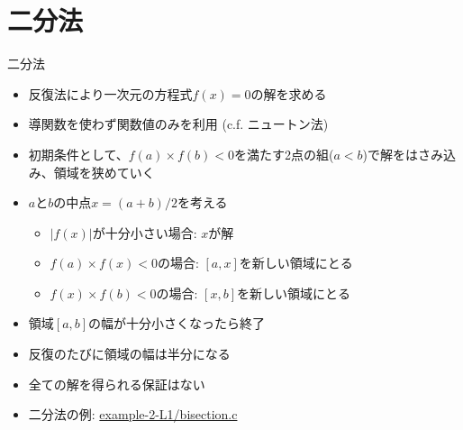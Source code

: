 \section{二分法}

\begin{frame}[t,fragile]{二分法}
  \begin{itemize}
  \item 反復法により一次元の方程式$f(x)=0$の解を求める
  \item 導関数を使わず関数値のみを利用 (c.f. ニュートン法)
  \item 初期条件として、$f(a) \times f(b) < 0$を満たす2点の組($a<b$)で解をはさみ込み、領域を狭めていく
  \item $a$と$b$の中点$x=(a+b)/2$を考える
    \begin{itemize}
    \item $|f(x)|$が十分小さい場合: $x$が解
    \item $f(a) \times f(x) < 0$の場合: $[a,x]$を新しい領域にとる
    \item $f(x) \times f(b) < 0$の場合: $[x,b]$を新しい領域にとる
    \end{itemize}
  \item 領域$[a,b]$の幅が十分小さくなったら終了
  \item 反復のたびに領域の幅は半分になる
  \item 全ての解を得られる保証はない
  \item 二分法の例: \href{https://github.com/todo-group/computer-experiments/blob/master/exercise/basics/bisection.c}{example-2-L1/bisection.c}
  \end{itemize}
\end{frame}
